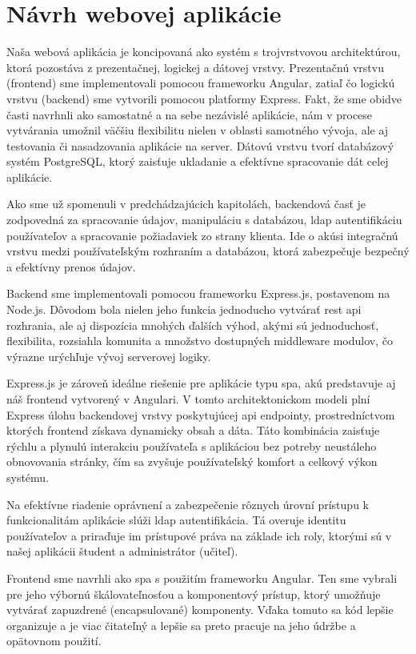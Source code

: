 \section{Návrh webovej aplikácie}
Naša webová aplikácia je koncipovaná ako systém s trojvrstvovou architektúrou, ktorá pozostáva z prezentačnej, logickej a dátovej vrstvy. 
Prezentačnú vrstvu (frontend) sme implementovali pomocou frameworku Angular, zatiaľ čo logickú vrstvu (backend) sme vytvorili pomocou platformy Express. 
Fakt, že sme obidve časti navrhnli ako samostatné a na sebe nezávislé aplikácie, nám v procese vytvárania umožnil väčšiu flexibilitu nielen v oblasti samotného vývoja, ale aj testovania či nasadzovania aplikácie na server.
Dátovú vrstvu tvorí databázový systém PostgreSQL, ktorý zaisťuje ukladanie a efektívne spracovanie dát celej aplikácie.

Ako sme už spomenuli v predchádzajúcich kapitolách, backendová časť je zodpovedná za spracovanie údajov, manipuláciu s databázou, \acrshort{ldap} autentifikáciu používateľov a spracovanie požiadaviek zo strany klienta. Ide o akúsi integračnú vrstvu medzi používateľským rozhraním a databázou, ktorá zabezpečuje bezpečný a efektívny prenos údajov. 

Backend sme implementovali pomocou frameworku Express.js, postavenom na Node.js. Dôvodom bola nielen jeho funkcia jednoducho vytvárať \acrshort{rest} \acrshort{api} rozhrania, ale aj dispozícia mnohých ďalších výhod, akými sú jednoduchosť, flexibilita, rozsiahla komunita a množstvo dostupných middleware modulov, čo výrazne urýchľuje vývoj serverovej logiky.

Express.js je zároveň ideálne riešenie pre aplikácie typu \acrshort{spa}, akú predstavuje aj náš frontend vytvorený v Angulari. V tomto architektonickom modeli plní Express úlohu backendovej vrstvy poskytujúcej \acrshort{api} endpointy, prostredníctvom ktorých frontend získava dynamicky obsah a dáta. Táto kombinácia zaisťuje rýchlu a plynulú interakciu používateľa s aplikáciou bez potreby neustáleho obnovovania stránky, čím sa zvyšuje používateľský komfort a celkový výkon systému.

Na efektívne riadenie oprávnení a zabezpečenie rôznych úrovní prístupu k funkcionalitám aplikácie slúži \acrshort{ldap} autentifikácia. Tá overuje identitu používateľov a priraďuje im prístupové práva na základe ich roly, ktorými sú v našej aplikácii študent a administrátor (učiteľ). 

Frontend sme navrhli ako \acrfull{spa} s použitím frameworku Angular. Ten sme vybrali pre jeho výbornú škálovateľnosťou a komponentový prístup, ktorý umožňuje vytvárať zapuzdrené (encapsulované) komponenty. Vďaka tomuto sa kód lepšie organizuje a je viac čitateľný  a lepšie sa preto pracuje na jeho údržbe a opätovnom použití.

